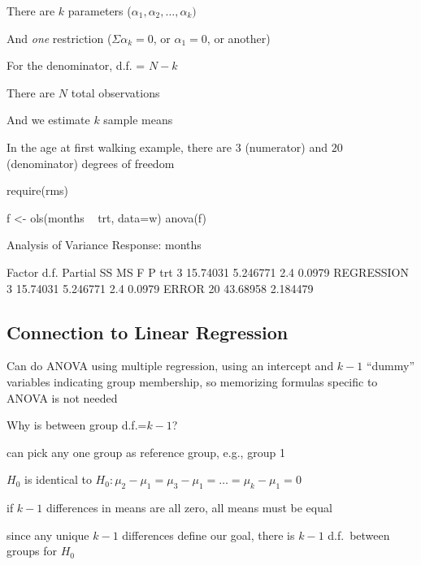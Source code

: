        \bi 
          \item There are $k$ parameters ($\alpha_1, \alpha_2, \ldots,
            \alpha_k)$ 
          \item And \textit{one} restriction ($\Sigma \alpha_k = 0$,
            or $\alpha_1 = 0$, or another) 
       \ei
     \item For the denominator, d.f. = $N - k$
       \bi 
          \item There are $N$ total observations
          \item And we estimate $k$ sample means
       \ei
     \item In the age at first walking example, there are $3$ (numerator) and $20$ (denominator) degrees of freedom
   \ei
\begin{Schunk}
\begin{Sinput}
require(rms)
\end{Sinput}
\begin{Sinput}
f <- ols(months ~ trt, data=w)
anova(f)
\end{Sinput}
\begin{Soutput}
                Analysis of Variance          Response: months 

 Factor     d.f. Partial SS MS       F   P     
 trt         3   15.74031   5.246771 2.4 0.0979
 REGRESSION  3   15.74031   5.246771 2.4 0.0979
 ERROR      20   43.68958   2.184479           
\end{Soutput}
\end{Schunk}
\ei


\subsection{Connection to Linear Regression}
\bi
\item Can do ANOVA using multiple regression, using an intercept and
  $k-1$ ``dummy'' variables indicating group membership, so memorizing
  formulas specific to ANOVA is not needed
\item Why is between group d.f.=$k-1$?
 \bi
 \item can pick any one group as reference group, e.g., group 1
 \item $H_0$ is identical to
   $H_{0}:\mu_{2}-\mu_{1}=\mu_{3}-\mu_{1}=\ldots=\mu_{k}-\mu_{1}=0$
 \item if $k-1$ differences in means are all zero, all means must be
   equal
 \item since any unique $k-1$ differences define our goal, there is $k-1$
   d.f.\ between groups for $H_0$
 \ei
\ei


